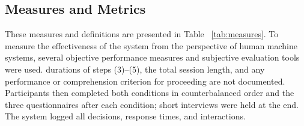 \documentclass[journal]{IEEEtran}
\theoremstyle{plain}
\theoremstyle{definition}
\providecommand{\DIFaddtex}[1]{{\protect\color{blue} \sf #1}} %
\providecommand{\DIFdeltex}[1]{{\protect\color{red} \scriptsize #1}} %
\providecommand{\DIFaddbegin}{} %
\providecommand{\DIFaddend}{} %
\providecommand{\DIFdelend}{} %
\providecommand{\DIFadd}[1]{\texorpdfstring{\DIFaddtex{#1}}{#1}} %
\providecommand{\DIFdel}[1]{\texorpdfstring{\DIFdeltex{#1}}{}} %
\newcommand{\DIFaddincludegraphics}[2][]{{\color{blue}\fbox{\DIFOincludegraphics[#1]{#2}}}} %
\DeclareRobustCommand{\DIFaddbegin}{\DIFOaddbegin \let\includegraphics\DIFaddincludegraphics} %
\DeclareRobustCommand{\DIFaddend}{\DIFOaddend \let\includegraphics\DIFOincludegraphics} %
\DeclareRobustCommand{\DIFdelend}{\DIFOaddend \let\includegraphics\DIFOincludegraphics} %
\begin{document}

\subsection{\DIFdel{Measures and Metrics}}
\addtocounter{subsection}{-1}%
\DIFdel{These measures and definitions are presented in Table ~\ref{tab:measures}. To measure the effectiveness of the system from the perspective of human machine systems, several objective performance measures and subjective evaluation tools were used. }\DIFdelend \DIFaddbegin \DIFadd{durations of steps (3)--(5), the total session length, and any performance or comprehension criterion for proceeding are not documented. Participants then completed both conditions in counterbalanced order and the three questionnaires after each condition; short interviews were held at the end. The system logged all decisions, response times, and interactions.
}\DIFaddend 
\end{document}
